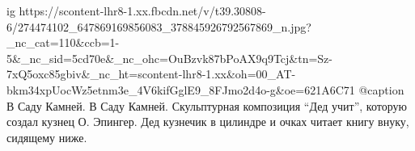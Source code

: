  
 
 
 
 

\ifcmt
  ig https://scontent-lhr8-1.xx.fbcdn.net/v/t39.30808-6/274474102_647869169856083_378845926792567869_n.jpg?_nc_cat=110&ccb=1-5&_nc_sid=5cd70e&_nc_ohc=OuBzvk87bPoAX9q9Tcj&tn=Sz-7xQ5oxc85gbiv&_nc_ht=scontent-lhr8-1.xx&oh=00_AT-bkm34xpUocWz5etnm3e_4V6kifGglE9_8FJmo2d4o-g&oe=621A6C71
	@caption В Саду Камней. В Саду Камней. Скульптурная композиция \enquote{Дед учит}, которую создал кузнец О. Эпингер. Дед кузнечик в цилиндре и очках читает книгу внуку, сидящему ниже.
\fi
